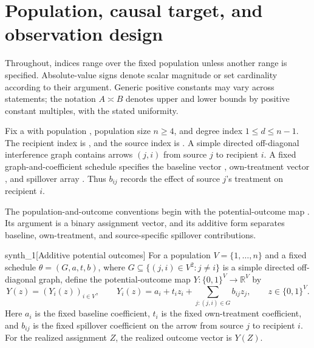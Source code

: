 \section{Population, causal target, and observation design}

Throughout, indices range over the fixed population unless another range is specified. Absolute-value signs denote scalar magnitude or set cardinality according to their argument. Generic positive constants may vary across statements; the notation \(A\asymp B\) denotes upper and lower bounds by positive constant multiples, with the stated uniformity.

Fix a  with population , population size \(n\ge4\), and degree index \(1\le d\le n-1\). The recipient index is , and the source index is . A simple directed off-diagonal interference graph  contains arrows \((j,i)\) from source \(j\) to recipient \(i\). A fixed graph-and-coefficient schedule  specifies the baseline vector , own-treatment vector , and spillover array . Thus \(b_{ij}\) records the effect of source \(j\)'s treatment on recipient \(i\).

The population-and-outcome conventions begin with the potential-outcome map . Its argument  is a binary assignment vector, and its additive form separates baseline, own-treatment, and source-specific spillover contributions.

\begin{definitionv}{synth_1}[Additive potential outcomes]
For a population \(V=\{1,\ldots,n\}\) and a fixed schedule \(\theta=(G,a,t,b)\), where \(G\subseteq\{(j,i)\in V^2:j\ne i\}\) is a simple directed off-diagonal graph, define the potential-outcome map \(Y:\{0,1\}^V\to\mathbb R^V\) by
\[
Y(z)=(Y_i(z))_{i\in V},
\qquad
Y_i(z)=a_i+t_i z_i+\sum_{j:(j,i)\in G}b_{ij}z_j,
\qquad z\in\{0,1\}^V.
\]
Here \(a_i\) is the fixed baseline coefficient, \(t_i\) is the fixed own-treatment coefficient, and \(b_{ij}\) is the fixed spillover coefficient on the arrow from source \(j\) to recipient \(i\). For the realized assignment \(Z\), the realized outcome vector is \(Y(Z)\).
\end{definitionv}

